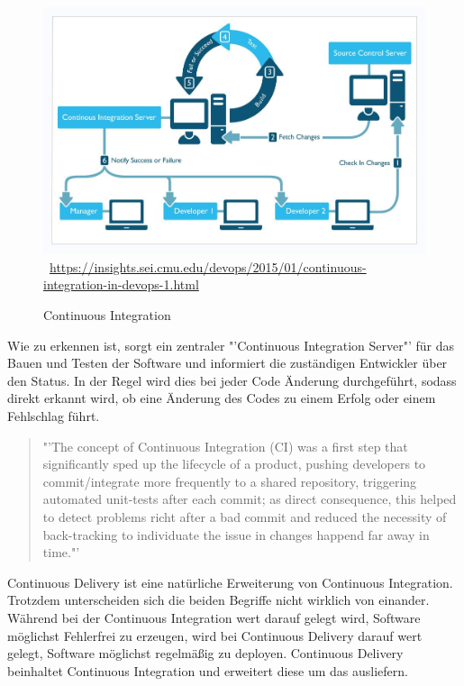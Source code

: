\begin{figure}[htb]
	\centering 
	\includegraphics[width=\linewidth]{content/images/continuous_integration}\
	\quelle\url{https://insights.sei.cmu.edu/devops/2015/01/continuous-integration-in-devops-1.html}
	\caption[Continuous Integration]{Continuous Integration\\}
	\label{fig:ContinuousIntegration}  
\end{figure}\noindent 
Wie zu erkennen ist, sorgt ein zentraler "'Continuous Integration Server"' für das Bauen und Testen der Software und informiert die zuständigen Entwickler über den Status. In der Regel wird dies bei jeder Code Änderung durchgeführt, sodass direkt erkannt wird, ob eine Änderung des Codes zu einem Erfolg oder einem Fehlschlag führt.
\\
\begin{quote}
	"'The concept of Continuous Integration (CI) was a first step that significantly sped up the lifecycle of a product, pushing developers to commit/integrate more frequently to a shared repository, triggering automated unit-tests after each commit; as direct consequence, this helped to detect problems richt after a bad commit and reduced the necessity of back-tracking to individuate the issue in changes happend far away in time."'\cite[in Introduction]{IEEE:CDMitJenkins}
\end{quote}
Continuous Delivery ist eine natürliche Erweiterung von Continuous Integration. Trotzdem unterscheiden sich die beiden Begriffe nicht wirklich von einander. Während bei der Continuous Integration wert darauf gelegt wird, Software möglichst Fehlerfrei zu erzeugen, wird bei Continuous Delivery  darauf wert gelegt, Software möglichst regelmäßig zu deployen. Continuous Delivery beinhaltet Continuous Integration und erweitert diese um das ausliefern.


